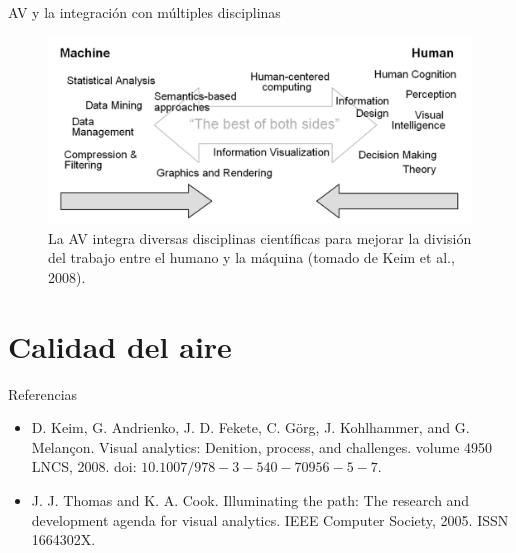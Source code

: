 \documentclass[aspectratio=169,xcolor=dvipsnames]{beamer}
\begin{document}
\begin{frame}{AV y la integración con múltiples disciplinas}

\begin{figure}[h]
\centering
\includegraphics[scale=0.25]{va_integrates_human_machine_keim_2008.png}
\caption{La AV integra diversas disciplinas científicas para mejorar la división del trabajo entre el humano y la máquina (tomado de Keim et al., 2008).}
\end{figure}
    
\end{frame}
\section{Calidad del aire}

\begin{frame}{Referencias}

    \begin{itemize}
        \item D. Keim, G. Andrienko, J. D. Fekete, C. Görg, J. Kohlhammer, and G. Melançon. Visual analytics: Denition, process, and challenges. volume 4950 LNCS, 2008. doi: $10.1007/978-3-540-70956-5-7$.
        \item J. J. Thomas and K. A. Cook. Illuminating the path: The research and development agenda for visual analytics. IEEE Computer Society, 2005. ISSN 1664302X.
    \end{itemize}

\end{frame}

\end{document}

